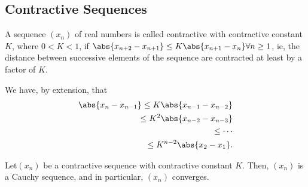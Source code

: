 \documentclass[12pt]{article}
\begin{document}
\subsection{Contractive Sequences}

\begin{definition}
  A sequence $(x_n)$ of real numbers is called contractive with contractive constant $K$, where $0 < K < 1$, if  $\abs{x_{n+2} - x_{n+1}} \leq K \abs{x_{n+1} - x_n} \forall n \geq 1$, ie, the distance between successive elements of the sequence are contracted at least by a factor of $K$.

  We have, by extension, that \begin{align*}
    \abs{x_n - x_{n-1}} \leq K \abs{x_{n-1} - x_{n-2}}\\
    \leq K^2 \abs{x_{n-2} - x_{n-3}}\\
    \leq \cdots \\
    \leq K^{n-2} \abs{x_2 - x_1}.
  \end{align*}
\end{definition}

\begin{theorem}\label{thm:contractiveconvergence}
  Let\footnotemark $(x_n)$ be a contractive sequence with contractive constant $K$. Then, $(x_n)$ is a Cauchy sequence, and in particular, $(x_n)$ converges.
\end{theorem}
\end{document}
